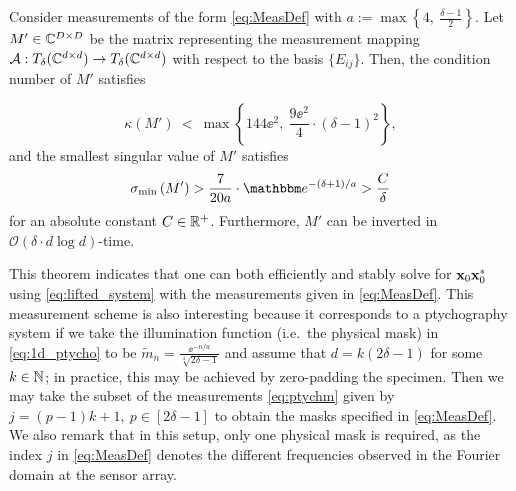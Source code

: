 \begin{theorem}
Consider measurements of the form \eqref{eq:MeasDef} with $a:= \max \left\{ 4,~\frac{\delta - 1}{2} \right\}$. 
Let $M' \in \mathbb{C}^{D \times D}$ be the matrix representing the measurement mapping $\mathcal{A} : T_{\delta}(\mathbb{C}^{d \times d}) \to T_{\delta}(\mathbb{C}^{d \times d})$ with respect to the basis $\{E_{ij}\}$.  Then, the condition number of $M'$ satisfies 



%
$$\kappa \left( M' \right) ~<~ \max
\left\{ 144 \ee^2,~\frac{9 \ee^2}{4} \cdot (\delta -
1)^2 \right \},$$
%
and the smallest singular value of $M'$ satisfies
%
$$\sigma_{\rm min} \left( M' \right) > \frac{7}{20 a} \cdot \ee^{-(\delta + 1)/a} > \frac{C}{\delta}$$
%
for an absolute constant $C \in \mathbb{R}^+$.  Furthermore, $M'$ can be
inverted in $\mathcal{O} \left( \delta \cdot d \log d \right)$-time.
\label{thm:WellCondMeas}
\end{theorem}

This theorem indicates that one can both efficiently and stably solve for $\mathbf x_0 \mathbf x_0^*$ using \eqref{eq:lifted_system} with the measurements given in \eqref{eq:MeasDef}.   This measurement scheme is also interesting because it corresponds to a ptychography system if we take the illumination function (i.e.~the physical mask) in \eqref{eq:1d_ptycho} to be $\widetilde{m}_n = \frac{\ee^{- n / a}}{\sqrt[4]{2 \delta - 1}}$ and assume that $d = k(2 \delta - 1)$ for some $k \in \mathbb{N}$; in practice, this may be achieved by zero-padding the specimen.  Then we may take the subset of the measurements \eqref{eq:ptychm} given by $j = (p -1)k + 1, \ p \in [2 \delta - 1]$ to obtain the masks specified in \eqref{eq:MeasDef}.  We also remark that in this setup, only one physical mask is required, as the index $j$ in \eqref{eq:MeasDef} denotes the different frequencies observed in the Fourier domain at the sensor array.


